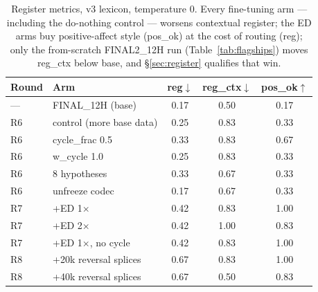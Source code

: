 \documentclass[11pt]{article}
\begin{document}
\begin{table}[h]
\centering
\small
\begin{tabular}{llccc}
\toprule
Round & Arm & reg$\downarrow$ & reg\_ctx$\downarrow$ & pos\_ok$\uparrow$ \\
\midrule
--- & FINAL\_12H (base)      & 0.17 & 0.50 & 0.17 \\
R6 & control (more base data) & 0.25 & 0.83 & 0.33 \\
R6 & cycle\_frac 0.5           & 0.33 & 0.83 & 0.67 \\
R6 & w\_cycle 1.0              & 0.25 & 0.83 & 0.33 \\
R6 & 8 hypotheses              & 0.33 & 0.67 & 0.33 \\
R6 & unfreeze codec            & 0.17 & 0.67 & 0.33 \\
R7 & +ED 1$\times$             & 0.42 & 0.83 & 1.00 \\
R7 & +ED 2$\times$             & 0.42 & 1.00 & 0.83 \\
R7 & +ED 1$\times$, no cycle   & 0.42 & 0.83 & 1.00 \\
R8 & +20k reversal splices     & 0.67 & 0.83 & 1.00 \\
R8 & +40k reversal splices     & 0.67 & 0.50 & 0.83 \\
\bottomrule
\end{tabular}
\caption{Register metrics, v3 lexicon, temperature 0. Every fine-tuning arm
--- including the do-nothing control --- worsens contextual register; the ED
arms buy positive-affect style (pos\_ok) at the cost of routing (reg); only
the from-scratch FINAL2\_12H run (Table~\ref{tab:flagships}) moves
reg\_ctx below base, and \S\ref{sec:register} qualifies that win.}
\label{tab:register-rounds}
\end{table}
\end{document}
